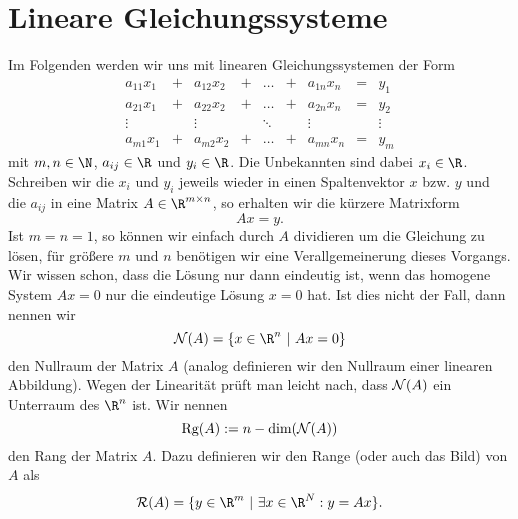 \documentclass[letterpaper,10pt,english]{jupyterBook}
\begin{document}
\section{Lineare Gleichungssysteme}
\label{\detokenize{vektorraeume/LGS:lineare-gleichungssysteme}}\label{\detokenize{vektorraeume/LGS::doc}}
Im Folgenden werden wir uns mit linearen Gleichungssystemen der Form
\begin{equation*}
\begin{matrix}
a_{11} x_1 &+& a_{12}x_2 &+& \ldots &+& a_{1n}x_n &=& y_1 \\
a_{21} x_1 &+& a_{22}x_2 &+& \ldots &+& a_{2n}x_n &=& y_2 \\
\vdots &&  \vdots && \ddots && \vdots && \vdots \\
a_{m1} x_1 &+& a_{m2}x_2 &+& \ldots &+& a_{mn}x_n &=& y_m
\end{matrix}
\end{equation*}
mit \(m,n \in \N\), \(a_{ij} \in \R\) und \(y_i \in \R\). Die Unbekannten sind dabei \(x_i \in \R\). Schreiben wir die \(x_i\) und \(y_i\) jeweils wieder in einen Spaltenvektor \(x\) bzw. \(y\) und die \(a_{ij}\) in eine Matrix \(A \in \R^{m \times n}\), so erhalten wir die kürzere Matrixform
\begin{equation*}
 A x = y .
\end{equation*}
Ist \(m=n=1\), so können wir einfach durch \(A\) dividieren um die Gleichung zu lösen, für größere \(m\) und \(n\) benötigen wir eine Verallgemeinerung dieses Vorgangs.
Wir wissen schon, dass die Lösung nur dann eindeutig ist, wenn das homogene System \(A x = 0\) nur die eindeutige Lösung \(x=0\) hat. Ist dies nicht der Fall, dann nennen wir
\begin{equation*}
 {\cal N}(A) = \{ x \in \R^n ~|~ Ax = 0 \}
\end{equation*}
den Nullraum der Matrix \(A\) (analog definieren wir den Nullraum einer linearen Abbildung). Wegen der Linearität prüft man leicht nach, dass \({\cal N}(A)\) ein Unterraum des \(\R^n\) ist. Wir nennen
\begin{equation*}
 \text{Rg}(A) := n - \text{dim}({\cal N}(A))
\end{equation*}
den Rang der Matrix \(A\). Dazu definieren wir den Range (oder auch das Bild) von \(A\) als
\begin{equation*}
 {\cal R}(A) = \{ y \in \R^m~|~\exists x \in \R^N: y = Ax\}.
\end{equation*}\label{vektorraeume/LGS:example-0}
\end{document}
